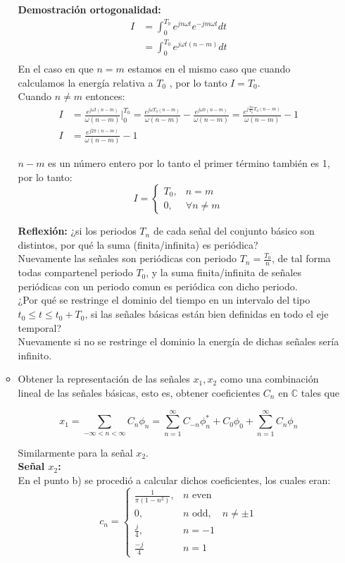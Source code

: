 \documentclass[12pt,a4paper]{report}
\begin{document}
\begin{enumerate}[label=\alph*),left=0pt]
\begin{itemize}[left=0pt]
\textbf{Demostración ortogonalidad:}
$$
\begin{aligned}
	I&=\int^{T_0}_0e^{jn\omega t}e^{-jm\omega t}dt\\
	&=\int_0^{T_0}e^{j\omega t(n-m)}dt\\
\end{aligned}
$$
	En el caso en que $n=m$ estamos en el mismo caso que cuando calculamos la energía relativa a $T_0$
	, por lo tanto $I=T_0$.\\
	Cuando $n\neq m$ entonces:
		  $$
		  \begin{aligned}
			  I&=\frac{e^{j\omega t(n-m)}}{\omega(n-m)}|^{T_0}_0
			    =\frac{e^{j\omega T_0(n-m)}}{\omega(n-m)}-\frac{e^{j\omega 0(n-m)}}{\omega(n-m)}
			    =\frac{e^{j\frac{2\pi}{T_0}T_0(n-m)}}{\omega(n-m)}-1\\
			  I&=\frac{e^{j2\pi(n-m)}}{\omega(n-m)}-1
		  \end{aligned}
		  $$

	$n-m$ es un número entero por lo tanto el primer término también es 1, por lo tanto:
		  $$
		  	I=\begin{cases}
				T_0,&n=m\\
				0,&\forall n \neq m
			\end{cases}
		  $$

	\textbf{Reflexión:} ¿si los periodos $T_n$ de cada señal del conjunto básico son distintos, por qué la suma
      (finita/infinita) es periódica? \\
		  Nuevamente las señales son periódicas con periodo $T_n=\frac{T_0}{n}$, de tal forma todas compartenel periodo $T_0$, y la suma finita/infinita de señales periódicas con un periodo comun es periódica con dicho periodo.\\
		  ¿Por qué se restringe el dominio del tiempo en un intervalo del tipo 
      $t_0 \leq t \leq t_0 + T_0$, si las señales básicas están bien definidas en todo el eje temporal?\\
		  Nuevamente si no se restringe el dominio la energía de dichas señales sería infinito.

    \item Obtener la representación de las señales $x_1, x_2$ como una combinación lineal de las señales básicas, esto 
      es, obtener coeficientes $C_n$ en $\mathbb{C}$ tales que

      $$x_1 = \sum_{-\infty < n < \infty} C_n \phi_n =
      \sum_{n=1}^{\infty} C_{-n} \phi_n^* + C_0 \phi_0 + \sum_{n=1}^{\infty} C_n \phi_n$$

      Similarmente para la señal $x_2$.\\
      \textbf{Señal $x_2$:}\\
      En el punto b) se procedió a calcular dichos coeficientes, los cuales eran:
      $$
      c_n = \begin{cases}
	      \frac{1}{\pi(1-n^2)}, & n \text{ even} \\[5pt]
	      0, & n \text{ odd}, \quad n \neq \pm 1 \\
	      \frac{j}{4}, & n=-1 \\
	      \frac{-j}{4} & n=1
      \end{cases}
      $$


\end{itemize}
\end{enumerate}
\end{document}

